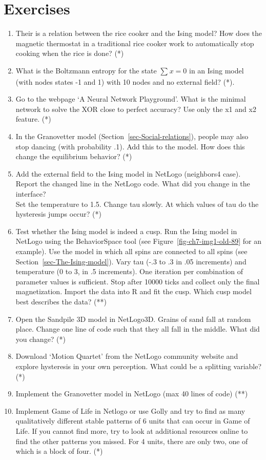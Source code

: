 \documentclass[
  a4paper,
  DIV=11,
  numbers=noendperiod,
  oneside]{scrreprt}
\begin{document}
\hypertarget{sec-Exercises}{%
\section{Exercises}\label{sec-Exercises}}

\begin{enumerate}
\def\labelenumi{\arabic{enumi})}
\item
  Their is a relation between the rice cooker and the Ising model? How
  does the magnetic thermostat in a traditional rice cooker work to
  automatically stop cooking when the rice is done? (*)
\item
  What is the Boltzmann entropy for the state \(\sum_{}^{}x = 0\) in an
  Ising model (with nodes states -1 and 1) with 10 nodes and no external
  field? (*).
\item
  Go to the webpage `A Neural Network Playground'. What is the minimal
  network to solve the XOR close to perfect accuracy? Use only the x1
  and x2 feature. (*)
\item
  In the Granovetter model (Section~\ref{sec-Social-relations}), people
  may also stop dancing (with probability .1). Add this to the model.
  How does this change the equilibrium behavior? (*)
\item
  Add the external field to the Ising model in NetLogo (neighbors4
  case). Report the changed line in the NetLogo code. What did you
  change in the interface?\\
  Set the temperature to 1.5. Change tau slowly. At which values of tau
  do the hysteresis jumps occur? (*)
\item
  Test whether the Ising model is indeed a cusp. Run the Ising model in
  NetLogo using the BehaviorSpace tool (see
  Figure~\ref{fig-ch7-img1-old-89} for an example). Use the model in
  which all spins are connected to all spins (see
  Section~\ref{sec-The-Ising-model}). Vary tau (-.3 to .3 in .05
  increments) and temperature (0 to 3, in .5 increments). One iteration
  per combination of parameter values is sufficient. Stop after 10000
  ticks and collect only the final magnetization. Import the data into R
  and fit the cusp. Which cusp model best describes the data? (**)
\item
  Open the Sandpile 3D model in NetLogo3D. Grains of sand fall at random
  place. Change one line of code such that they all fall in the middle.
  What did you change? (*)
\item
  Download `Motion Quartet' from the NetLogo community website and
  explore hysteresis in your own perception. What could be a splitting
  variable? (*)
\item
  Implement the Granovetter model in NetLogo (max 40 lines of code) (**)
\item
  Implement Game of Life in Netlogo or use Golly and try to find as many
  qualitatively different stable patterns of 6 units that can occur in
  Game of Life. If you cannot find more, try to look at additional
  resources online to find the other patterns you missed. For 4 units,
  there are only two, one of which is a block of four. (*)
\end{enumerate}
\end{document}

